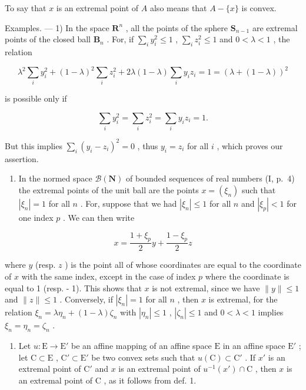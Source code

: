 To say that \(x\) is an extremal point of \(A\) also means that \(A - \{x\}\) is convex.

Examples. --- 1) In the space \(\mathbf{R}^n\) , all the points of the sphere \(\mathbf{S}_{n-1}\) are extremal points of the closed ball \(\mathbf{B}_n\) . For, if \(\sum_{i} y_i^2 \leqslant 1\) , \(\sum_{i} z_i^2 \leqslant 1\) and \(0 < \lambda < 1\) , the relation

\[
\lambda^ {2} \sum_ {i} y _ {i} ^ {2} + (1 - \lambda) ^ {2} \sum_ {i} z _ {i} ^ {2} + 2 \lambda (1 - \lambda) \sum_ {i} y _ {i} z _ {i} = 1 = (\lambda + (1 - \lambda)) ^ {2}
\]

is possible only if

\[
\sum_ {i} y _ {i} ^ {2} = \sum_ {i} z _ {i} ^ {2} = \sum_ {i} y _ {i} z _ {i} = 1.
\]

But this implies \(\sum_{i}(y_i - z_i)^2 = 0\) , thus \(y_i = z_i\) for all \(i\) , which proves our assertion.

\begin{enumerate}
\def\labelenumi{\arabic{enumi})}
\setcounter{enumi}{1}
\tightlist
\item
  In the normed space \(\mathcal{B}(\mathbf{N})\) of bounded sequences of real numbers (I, p.~4) the extremal points of the unit ball are the points \(x = (\xi_n)\) such that \(|\xi_n| = 1\) for all \(n\) . For, suppose that we had \(|\xi_n| \leqslant 1\) for all \(n\) and \(|\xi_p| < 1\) for one index \(p\) . We can then write
\end{enumerate}

\[
x = \frac {1 + \xi_ {p}}{2} y + \frac {1 - \xi_ {p}}{2} z
\]

where \(y\) (resp. \(z\) ) is the point all of whose coordinates are equal to the coordinate of \(x\) with the same index, except in the case of index \(p\) where the coordinate is equal to 1 (resp. - 1). This shows that \(x\) is not extremal, since we have \(\| y \| \leqslant 1\) and \(\| z \| \leqslant 1\) . Conversely, if \(|\xi_n| = 1\) for all \(n\) , then \(x\) is extremal, for the relation \(\xi_n = \lambda \eta_n + (1 - \lambda) \zeta_n\) with \(|\eta_n| \leqslant 1\) , \(|\zeta_n| \leqslant 1\) and \(0 < \lambda < 1\) implies \(\xi_n = \eta_n = \zeta_n\) .

\begin{enumerate}
\def\labelenumi{\arabic{enumi})}
\setcounter{enumi}{2}
\tightlist
\item
  Let \(u: \mathrm{E} \to \mathrm{E}'\) be an affine mapping of an affine space \(\mathrm{E}\) in an affine space \(\mathrm{E}'\) ; let \(\mathrm{C} \subset \mathrm{E}\) , \(\mathrm{C}' \subset \mathrm{E}'\) be two convex sets such that \(u(\mathrm{C}) \subset \mathrm{C}'\) . If \(x'\) is an extremal point of \(\mathrm{C}'\) and \(x\) is an extremal point of \(u^{-1}(x') \cap \mathrm{C}\) , then \(x\) is an extremal point of \(\mathrm{C}\) , as it follows from def. 1.
\end{enumerate}

